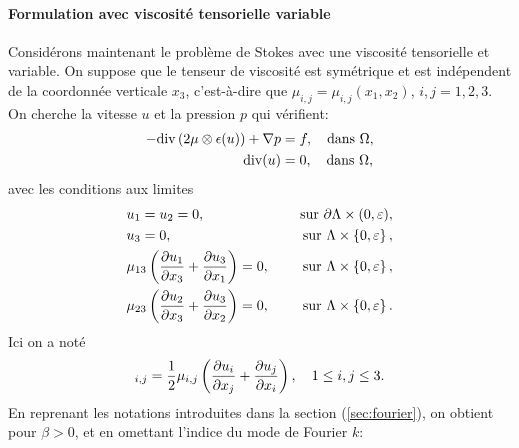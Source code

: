 %

\paragraph{Formulation avec viscosité tensorielle variable}
Considérons maintenant le problème de Stokes avec une viscosité
tensorielle et variable. On suppose que le tenseur de viscosité est
symétrique et est indépendent de la coordonnée verticale $x_3$,
c'est-à-dire que $\mu_{i,j} = \mu_{i,j}(x_1, x_2)$, $i,j = 1,2,3$. On
cherche la vitesse $u$ et la pression $p$ qui vérifient:
\begin{align}
  -\div\parent{2\mu\otimes \epsilon(u)} + \nabla p &= f, %
  \quad \text{dans } \Omega,\\
  \div(u) &= 0, %
  \quad \text{dans } \Omega,
\end{align}
avec les conditions aux limites
\begin{align}
  &u_1 = u_2 = 0, &\quad \text{ sur } \partial \Lambda \times
  (0,\varepsilon),\\
  &u_3 = 0, &\quad \text{ sur }  \Lambda \times \left\{ 0,\varepsilon \right\},\\
  &\mu_{13}\left( \frac{\partial u_1}{\partial x_3} + \frac{\partial u_3}{\partial
      x_1} \right) = 0, &\quad \text{ sur }  \Lambda \times \left\{ 0,\varepsilon \right\},\\
  &\mu_{23}\left( \frac{\partial u_2}{\partial x_3} + \frac{\partial u_3}{\partial
  x_2} \right) = 0, &\quad \text{ sur }  \Lambda \times \left\{ 0,\varepsilon \right\}.
\end{align}
Ici on a noté
\begin{equation}
  [\mu \otimes \straintensor(u)]_{i,j} %
  = \frac{1}{2}\mu_{i,j}\parent{\frac{\partial u_i}{\partial x_j} %
                              + \frac{\partial u_j}{\partial x_i}},%
  \quad 1\leq i,j\leq 3.
\end{equation}
En reprenant les notations introduites dans la section
(\ref{sec:fourier}), on obtient pour $\beta > 0$, et en omettant
l'indice du mode de Fourier $k$:
